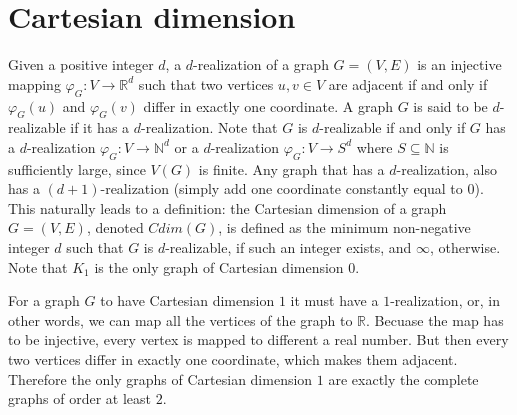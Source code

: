 \documentclass[12pt,a4paper,titlepage,openany]{report}
\begin{document}
\chapter{Cartesian dimension}\label{cdim-chapter}
Given a positive integer $d$, a $d$-realization of a graph $G=(V,E)$ is an injective mapping $\varphi_G:V\to \mathbb{R}^d$ such that two vertices $u, v \in V$ are adjacent if and only if $\varphi_G(u)$ and $\varphi_G(v)$ differ in exactly one coordinate. A graph $G$ is said to be $d$-realizable if it has a $d$-realization. Note that $G$ is $d$-realizable if and only if $G$ has a $d$-realization $\varphi_G : V \rightarrow \mathbb{N}^d$ or a $d$-realization $\varphi_G:V\to S^d$ where $S\subseteq \mathbb{N}$ is sufficiently large, since $V(G)$ is finite.\newline
Any graph that has a $d$-realization, also has a $(d+1)$-realization (simply add one coordinate constantly equal to $0$). This naturally leads to a definition: the Cartesian dimension of a graph $G = (V, E)$, denoted $Cdim(G)$, is defined as the minimum non-negative integer $d$ such that $G$ is $d$-realizable, if such an integer exists, and $\infty$, otherwise. Note that $K_1$ is the only graph of Cartesian dimension 0.\newline

For a graph $G$ to have Cartesian dimension $1$ it must have a $1$-realization, or, in other words, we can map all the vertices of the graph to $\mathbb{R}$. Becuase the map has to be injective, every vertex is mapped to different a real number. But then every two vertices differ in exactly one coordinate, which makes them adjacent. Therefore the only graphs of Cartesian dimension $1$ are exactly the complete graphs of order at least $2$.
\end{document}
